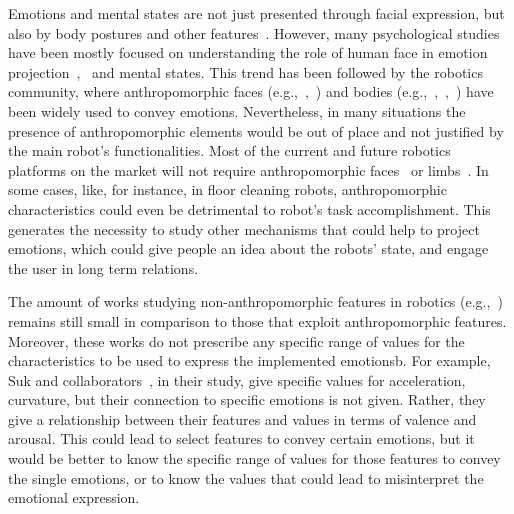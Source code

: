 
Emotions and mental states are not just presented through facial expression, but also by body postures and other features~\cite{Gelder2008}. However,  many psychological studies have been mostly focused on understanding the role of human face in emotion projection~\cite{Ekman2004},~\cite{kleinsmith2012affective} and mental states. This trend has been followed by the robotics community, where anthropomorphic faces (e.g.,~\cite{Arras2012},~\cite{Breazeal2002}) and bodies (e.g.,~\cite{Canamero2010},~\cite{haering2011},~\cite{Destephe2013}) have been widely used to convey emotions.
Nevertheless, in many situations the presence of anthropomorphic elements would be out of place and not justified by the main robot's functionalities. Most of the current and future robotics platforms on the market will not require anthropomorphic faces~\cite{Breazeal2002} or limbs~\cite{Li2011}. In some cases, like, for instance, in floor cleaning robots, anthropomorphic characteristics could even be detrimental to robot's task accomplishment.
This generates the necessity to study other mechanisms that could help to project emotions, which could give people an idea about the robots' state, and engage the user in long term relations.

The amount of works studying non-anthropomorphic features in robotics (e.g.,~\cite{Saerbeck2010,Lakatos2014,Sharma2013,Novika2015}) remains still small in comparison to those that exploit anthropomorphic features. Moreover, these works do not prescribe any specific range of values for the characteristics to be used to express the  implemented emotionsb. For example, Suk and collaborators~\cite{NAM2014}, in their study, give specific values for acceleration, curvature, but their connection to specific emotions is not given. Rather, they give a relationship between their features and values in terms of valence and arousal. This could lead to select features to convey certain emotions, but it would be better to know the specific range of values for those features to convey the single emotions, or to know the values that could lead to misinterpret the emotional expression.
 
